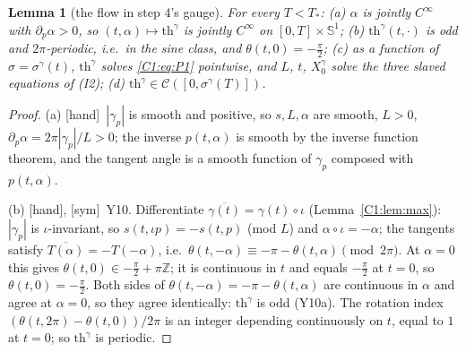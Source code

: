 \documentclass[11pt]{article}
\newtheorem{lemma}{Lemma}[section]\newtheorem{proposition}[lemma]{Proposition}\newtheorem{theorem}[lemma]{Theorem}\newtheorem{remark}[lemma]{Remark}
\newcommand{\tH}{\textup{[hand]}}\newcommand{\tS}{\textup{[sym]}}\newcommand{\tC}{\textup{[cert]}}\newcommand{\tI}{\textup{[cited]}}\newcommand{\tN}{\textup{[num]}}\newcommand{\tL}{\textup{[Lean]}}
\begin{document}
\begin{lemma}[the flow in step 4's gauge]\label{C1:lem:gauge}
For every $T<T_*$: (a) $\alpha$ is jointly $C^\infty$ with $\partial_p\alpha>0$, so $(t,\alpha)\mapsto\mathrm{th}^\gamma$ is jointly $C^\infty$ on $[0,T]\times\mathbb S^1$; (b) $\mathrm{th}^\gamma(t,\cdot)$ is odd and $2\pi$-periodic, i.e.\ in the sine class, and $\theta(t,0)=-\frac\pi2$; (c) as a function of $\sigma=\sigma^\gamma(t)$, $\mathrm{th}^\gamma$ solves \eqref{C1:eq:P1} pointwise, and $L$, $t$, $X_0^\gamma$ solve the three slaved equations of (I2); (d) $\mathrm{th}^\gamma\in\mathcal C([0,\sigma^\gamma(T)])$.
\end{lemma}
\begin{proof}
(a) \tH\ $|\gamma_p|$ is smooth and positive, so $s,L,\alpha$ are smooth, $L>0$, $\partial_p\alpha=2\pi|\gamma_p|/L>0$; the inverse $p(t,\alpha)$ is smooth by the inverse function theorem, and the tangent angle is a smooth function of $\gamma_p$ composed with $p(t,\alpha)$.

(b) \tH, \tS\ Y10. Differentiate $\overline{\gamma(t)}=\gamma(t)\circ\iota$ (Lemma~\ref{C1:lem:max}): $|\gamma_p|$ is $\iota$-invariant, so $s(t,\iota p)=-s(t,p)$ (mod $L$) and $\alpha\circ\iota=-\alpha$; the tangents satisfy $\overline{T(\alpha)}=-T(-\alpha)$, i.e.\ $\theta(t,-\alpha)\equiv-\pi-\theta(t,\alpha)\pmod{2\pi}$. At $\alpha=0$ this gives $\theta(t,0)\in-\frac\pi2+\pi\mathbb Z$; it is continuous in $t$ and equals $-\frac\pi2$ at $t=0$, so $\theta(t,0)=-\frac\pi2$. Both sides of $\theta(t,-\alpha)=-\pi-\theta(t,\alpha)$ are continuous in $\alpha$ and agree at $\alpha=0$, so they agree identically: $\mathrm{th}^\gamma$ is odd (Y10a). The rotation index $(\theta(t,2\pi)-\theta(t,0))/2\pi$ is an integer depending continuously on $t$, equal to $1$ at $t=0$; so $\mathrm{th}^\gamma$ is periodic.


\end{proof}
\end{document}
